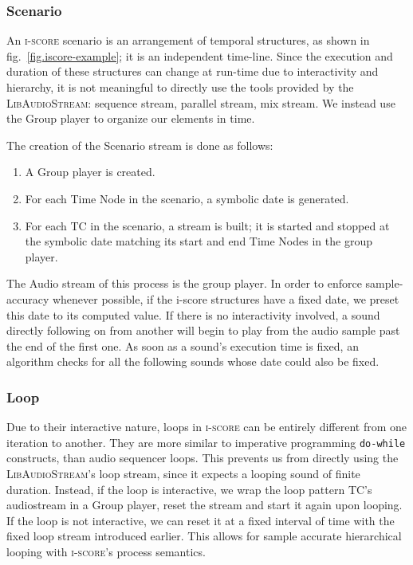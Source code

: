 \documentclass{article}
\newcommand*{\LibAudioStream}{\textsc{LibAudioStream}\xspace}
\newcommand*{\iscore}{\textsc{i-score}\xspace}
\newcommand*{\timeconstraint}{\ac{TC}\xspace}
\begin{document}
\subsubsection{Scenario}
An \iscore scenario is an arrangement of temporal structures, as shown in fig.~\ref{fig.iscore-example}; it is an independent time-line.
Since the execution and duration of these structures can change at run-time due to interactivity and hierarchy, it is not meaningful to directly use the tools provided by the \LibAudioStream: sequence stream, parallel stream, mix stream.
We instead use the Group player to organize our elements in time.

The creation of the Scenario stream is done as follows: 
\begin{enumerate}
	\item A Group player is created.
	\item For each Time Node in the scenario, a symbolic date is generated.
	\item For each \timeconstraint in the scenario, a stream is built; it is started and stopped at the symbolic date matching its start and end Time Nodes in the group player.
\end{enumerate}

The Audio stream of this process is the group player.
In order to enforce sample-accuracy whenever possible, if the i-score structures have a fixed date, we preset this date to its computed value.
If there is no interactivity involved, a sound directly following on from another will begin to play from the audio sample past the end of the first one. 
As soon as a sound's execution time is fixed, an algorithm checks for all the following sounds whose date could also be fixed.

\subsubsection{Loop}
Due to their interactive nature, loops in \iscore can be entirely different from 
one iteration to another. 
They are more similar to imperative programming \texttt{do-while} constructs, than audio sequencer loops.
This prevents us from directly using the \LibAudioStream's loop stream, since it expects a looping sound of finite duration.
Instead, if the loop is interactive, we wrap the loop pattern \timeconstraint's audiostream in a Group player, reset the stream and start it again upon looping.
If the loop is not interactive, we can reset it at a fixed interval of time with the fixed loop stream introduced earlier.
This allows for sample accurate hierarchical looping with \iscore's process semantics.
\end{document}
